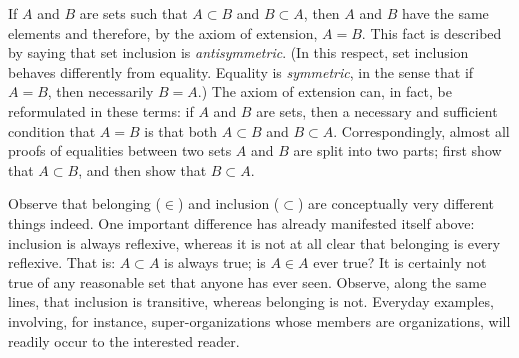   If $A$ and $B$ are sets such that $A \subset B$ and $B \subset A$, then $A$ and $B$ have the same elements and therefore, by the axiom of extension, $A = B$. 
 This fact is described by saying that set inclusion is \textit{antisymmetric}. 
 (In this respect, set inclusion behaves differently from equality. 
 Equality is \textit{symmetric}, in the sense that if $A = B$, then necessarily $B = A$.) 
 The axiom of extension can, in fact, be reformulated in these terms: if $A$ and $B$ are sets, then a necessary and sufficient condition that $A = B$ is that both $A \subset B$ and $B \subset A$. 
 Correspondingly, almost all proofs of equalities between two sets $A$ and $B$ are split into two parts; first show that $A \subset B$, and then show that $B \subset A$.


  Observe that belonging ($\in$) and inclusion ($\subset$) are conceptually very different things indeed. 
 One important difference has already manifested itself above: inclusion is always reflexive, whereas it is not at all clear that belonging is every reflexive. 
 That is: $A \subset A$ is always true; is $A \in A$ ever true? 
 It is certainly not true of any reasonable set that anyone has ever seen. 
 Observe, along the same lines, that inclusion is transitive, whereas belonging is not. 
 Everyday examples, involving, for instance, super-organizations whose members are organizations, will readily occur to the interested reader.
